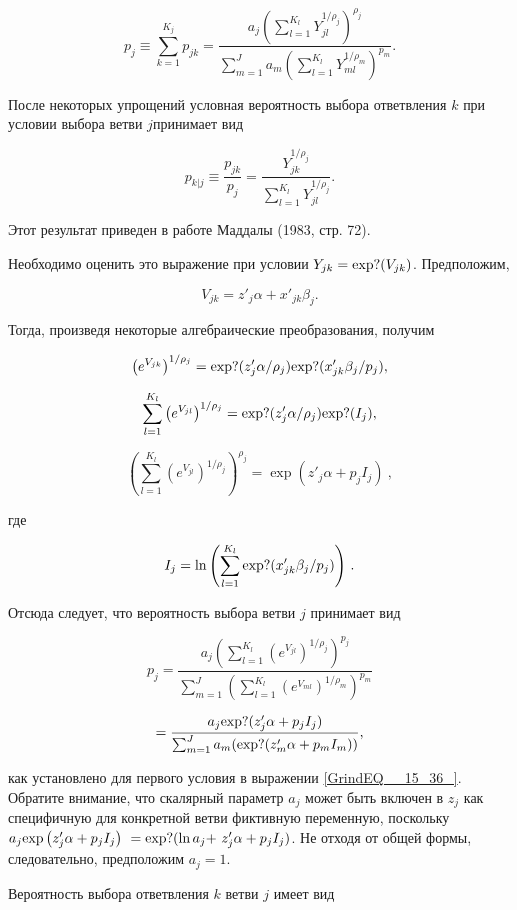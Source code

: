 \[p_j\equiv \sum^{K_j}_{k=1}{p_{jk}}=\frac{a_j{\left(\sum^{K_l}_{l=1}{Y^{{1}/{{\rho }_j}}_{jl}}\right)}^{{\rho }_j}}{{\sum^J_{m=1}{a_m\left(\sum^{K_l}_{l=1}{Y^{{1}/{{\rho }_m}}_{ml}}\right)}}^{p_m}}.\] 

После некоторых упрощений условная вероятность выбора ответвления $k$ при условии выбора ветви $j$принимает вид

\[p_{k|j}\equiv \frac{p_{jk}}{p_j}=\frac{Y^{{1}/{{\rho }_j}}_{jk}}{\sum^{K_l}_{l=1}{Y^{{1}/{{\rho }_j}}_{jl}}}.\] 

Этот результат приведен в работе Маддалы (1983, стр. 72).

Необходимо оценить это выражение при условии $Y_{jk}={\rm exp}?(V_{jk})$. Предположим, 

\[V_{jk}=z'_j\alpha +x'_{jk}{\beta }_j.\] 

Тогда, произведя некоторые алгебраические преобразования, получим

\[{\left(e^{V_{jk}}\right)}^{{1}/{{\rho }_j}}={\rm exp}?({z'_j\alpha }/{{\rho }_j}){\rm exp}?(x'_{jk}{\beta }_j/p_j),\] 

\[\sum^{K_l}_{l=1}{{\left(e^{V_{jl}}\right)}^{{1}/{{\rho }_j}}}={\rm exp}?({z'_j\alpha }/{{\rho }_j}){\rm exp}?(I_j),\] 

\[{\left(\sum^{K_l}_{l=1}{{\left(e^{V_{jl}}\right)}^{{1}/{{\rho }_j}}}\right)}^{{\rho }_j}={\exp  \left(z'_j\alpha +p_jI_j\right)\ },\] 

где

\[I_j={\ln  \left(\sum^{K_l}_{l=1}{{\rm exp}?(x'_{jk}{\beta }_j/p_j)}\right)\ }.\] 

Отсюда следует, что вероятность выбора ветви $j$ принимает вид

\[p_j=\frac{a_j{\left(\sum^{K_l}_{l=1}{{\left(e^{V_{jl}}\right)}^{{1}/{{\rho }_j}}}\right)}^{p_j}}{\sum^J_{m=1}{{\left(\sum^{K_l}_{l=1}{{\left(e^{V_{ml}}\right)}^{{1}/{{\rho }_m}}}\right)}^{p_m}}}\] 

\[=\frac{a_j{\rm exp}?(z'_j\alpha +p_jI_j)}{\sum^J_{m=1}{a_m({\rm exp}?(z'_m\alpha +p_mI_m))}},\] 

как установлено для первого условия в выражении \eqref{GrindEQ__15_36_}. Обратите внимание, что скалярный параметр $a_j$ может быть включен в $z_j$ как специфичную для конкретной ветви фиктивную переменную, поскольку $a_j{\exp  \left(z'_j\alpha +p_jI_j\right)\ }={\rm exp}?({\ln  a_j+\ }z'_j\alpha +p_jI_j)$. Не отходя от общей формы, следовательно, предположим $a_j=1$.

Вероятность выбора ответвления $k$ ветви $j$ имеет вид

